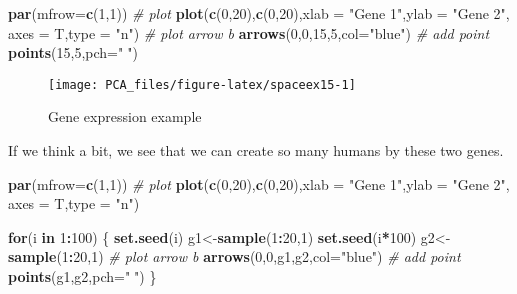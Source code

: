 \documentclass[
]{book}
\newenvironment{Shaded}{\begin{snugshade}}{\end{snugshade}}
\newcommand{\CommentTok}[1]{\textcolor[rgb]{0.56,0.35,0.01}{\textit{#1}}}
\newcommand{\ControlFlowTok}[1]{\textcolor[rgb]{0.13,0.29,0.53}{\textbf{#1}}}
\newcommand{\DataTypeTok}[1]{\textcolor[rgb]{0.13,0.29,0.53}{#1}}
\newcommand{\DecValTok}[1]{\textcolor[rgb]{0.00,0.00,0.81}{#1}}
\newcommand{\KeywordTok}[1]{\textcolor[rgb]{0.13,0.29,0.53}{\textbf{#1}}}
\newcommand{\NormalTok}[1]{#1}
\newcommand{\OperatorTok}[1]{\textcolor[rgb]{0.81,0.36,0.00}{\textbf{#1}}}
\newcommand{\StringTok}[1]{\textcolor[rgb]{0.31,0.60,0.02}{#1}}
\theoremstyle{definition}
\theoremstyle{definition}
\theoremstyle{definition}
\theoremstyle{remark}
\begin{document}
\begin{Shaded}
\begin{Highlighting}[]
\KeywordTok{par}\NormalTok{(}\DataTypeTok{mfrow=}\KeywordTok{c}\NormalTok{(}\DecValTok{1}\NormalTok{,}\DecValTok{1}\NormalTok{))}
\CommentTok{# plot}
\KeywordTok{plot}\NormalTok{(}\KeywordTok{c}\NormalTok{(}\DecValTok{0}\NormalTok{,}\DecValTok{20}\NormalTok{),}\KeywordTok{c}\NormalTok{(}\DecValTok{0}\NormalTok{,}\DecValTok{20}\NormalTok{),}\DataTypeTok{xlab =} \StringTok{"Gene 1"}\NormalTok{,}\DataTypeTok{ylab =} \StringTok{"Gene 2"}\NormalTok{,}
 \DataTypeTok{axes =}\NormalTok{ T,}\DataTypeTok{type =} \StringTok{"n"}\NormalTok{)}
\CommentTok{# plot arrow b}
\KeywordTok{arrows}\NormalTok{(}\DecValTok{0}\NormalTok{,}\DecValTok{0}\NormalTok{,}\DecValTok{15}\NormalTok{,}\DecValTok{5}\NormalTok{,}\DataTypeTok{col=}\StringTok{"blue"}\NormalTok{)}
\CommentTok{# add point}
\KeywordTok{points}\NormalTok{(}\DecValTok{15}\NormalTok{,}\DecValTok{5}\NormalTok{,}\DataTypeTok{pch=}\StringTok{"👶"}\NormalTok{)}
\end{Highlighting}
\end{Shaded}

\begin{figure}

{\centering \texttt{[image: PCA\_files/figure-latex/spaceex15-1]} 

}

\caption{Gene expression example}\label{fig:spaceex15}
\end{figure}

If we think a bit, we see that we can create so many humans by these two genes.

\begin{Shaded}
\begin{Highlighting}[]
\KeywordTok{par}\NormalTok{(}\DataTypeTok{mfrow=}\KeywordTok{c}\NormalTok{(}\DecValTok{1}\NormalTok{,}\DecValTok{1}\NormalTok{))}
\CommentTok{# plot}
\KeywordTok{plot}\NormalTok{(}\KeywordTok{c}\NormalTok{(}\DecValTok{0}\NormalTok{,}\DecValTok{20}\NormalTok{),}\KeywordTok{c}\NormalTok{(}\DecValTok{0}\NormalTok{,}\DecValTok{20}\NormalTok{),}\DataTypeTok{xlab =} \StringTok{"Gene 1"}\NormalTok{,}\DataTypeTok{ylab =} \StringTok{"Gene 2"}\NormalTok{,}
 \DataTypeTok{axes =}\NormalTok{ T,}\DataTypeTok{type =} \StringTok{"n"}\NormalTok{)}

\ControlFlowTok{for}\NormalTok{(i }\ControlFlowTok{in} \DecValTok{1}\OperatorTok{:}\DecValTok{100}\NormalTok{)}
\NormalTok{\{}
  \KeywordTok{set.seed}\NormalTok{(i)}
\NormalTok{  g1<-}\KeywordTok{sample}\NormalTok{(}\DecValTok{1}\OperatorTok{:}\DecValTok{20}\NormalTok{,}\DecValTok{1}\NormalTok{)}
   \KeywordTok{set.seed}\NormalTok{(i}\OperatorTok{*}\DecValTok{100}\NormalTok{)}
\NormalTok{  g2<-}\KeywordTok{sample}\NormalTok{(}\DecValTok{1}\OperatorTok{:}\DecValTok{20}\NormalTok{,}\DecValTok{1}\NormalTok{)}
  \CommentTok{# plot arrow b}
\KeywordTok{arrows}\NormalTok{(}\DecValTok{0}\NormalTok{,}\DecValTok{0}\NormalTok{,g1,g2,}\DataTypeTok{col=}\StringTok{"blue"}\NormalTok{)}
\CommentTok{# add point}
\KeywordTok{points}\NormalTok{(g1,g2,}\DataTypeTok{pch=}\StringTok{"👶"}\NormalTok{)}
\NormalTok{\}}
\end{Highlighting}
\end{Shaded}
\end{document}
